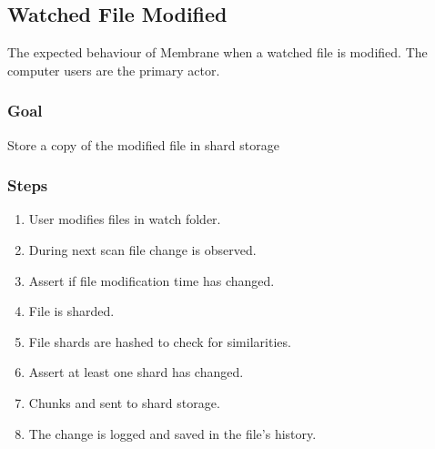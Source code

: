 \documentclass[a4paper, 11pt, twocolumn, twoside]{report}
\begin{document}
\subsection{Watched File Modified}
The expected behaviour of Membrane when a watched file is modified. The computer users are the primary actor.

\subsubsection{Goal}

Store a copy of the modified file in shard storage

\subsubsection{Steps}

\begin{enumerate}
 \item User modifies files in watch folder.
 \item During next scan file change is observed.
 \item Assert if file modification time has changed.
 \item File is sharded.
 \item File shards are hashed to check for similarities.
 \item Assert at least one shard has changed.
 \item Chunks and sent to shard storage.
 \item The change is logged and saved in the file's history.
\end{enumerate}
\end{document}
